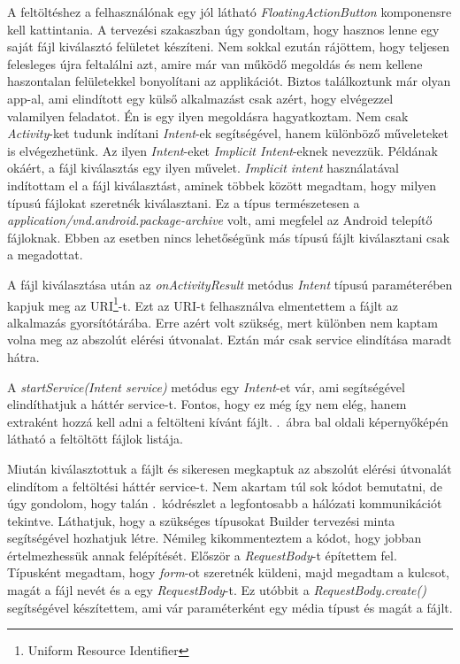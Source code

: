 \documentclass{thesis-ekf}
\theoremstyle{definition}
\theoremstyle{remark}
\begin{document}
A feltöltéshez a felhasználónak egy jól látható \emph{FloatingActionButton} komponensre kell kattintania.
A tervezési szakaszban úgy gondoltam, hogy hasznos lenne egy saját fájl kiválasztó felületet készíteni.
Nem sokkal ezután rájöttem, hogy teljesen felesleges újra feltalálni azt, amire már van működő megoldás és nem kellene haszontalan felületekkel bonyolítani az applikációt.
Biztos találkoztunk már olyan app-al, ami elindított egy külső alkalmazást csak azért, hogy elvégezzel valamilyen feladatot.
Én is egy ilyen megoldásra hagyatkoztam.
Nem csak \emph{Activity}-ket tudunk indítani \emph{Intent}-ek segítségével, hanem különböző műveleteket is elvégezhetünk.
Az ilyen \emph{Intent}-eket \emph{Implicit Intent}-eknek nevezzük.
Példának okáért, a fájl kiválasztás egy ilyen művelet.
\emph{Implicit intent} használatával indítottam el a fájl kiválasztást, aminek többek között megadtam, hogy milyen típusú fájlokat szeretnék kiválasztani.
Ez a típus természetesen a \emph{application/vnd.android.package-archive} volt, ami megfelel az Android telepítő fájloknak.
Ebben az esetben nincs lehetőségünk más típusú fájlt kiválasztani csak a megadottat.

A fájl kiválasztása után az \emph{onActivityResult} metódus \emph{Intent} típusú paraméterében kapjuk meg az URI\footnote{Uniform Resource Identifier}-t.
Ezt az URI-t felhasználva elmentettem a fájlt az alkalmazás gyorsítótárába.
Erre azért volt szükség, mert különben nem kaptam volna meg az abszolút elérési útvonalat.
Eztán már csak service elindítása maradt hátra. 

A \emph{startService(Intent service)} metódus egy \emph{Intent}-et vár, ami segítségével elindíthatjuk a háttér service-t.
Fontos, hogy ez még így nem elég, hanem extraként hozzá kell adni a feltölteni kívánt fájlt.
.~ábra bal oldali képernyőképén látható a feltöltött fájlok listája.

Miután kiválasztottuk a fájlt és sikeresen megkaptuk az abszolút elérési útvonalát elindítom a feltöltési háttér service-t.
Nem akartam túl sok kódot bemutatni, de úgy gondolom, hogy talán .~kódrészlet a legfontosabb a hálózati kommunikációt tekintve.
Láthatjuk, hogy a szükséges típusokat Builder tervezési minta segítségével hozhatjuk létre.
Némileg kikommenteztem a kódot, hogy jobban értelmezhessük annak felépítését.
Először a \emph{RequestBody}-t építettem fel.
Típusként megadtam, hogy \emph{form}-ot szeretnék küldeni, majd megadtam a kulcsot, magát a fájl nevét és a egy \emph{RequestBody}-t.
Ez utóbbit a \emph{RequestBody.create()} segítségével készítettem, ami vár paraméterként egy média típust és magát a fájlt.
\end{document}
